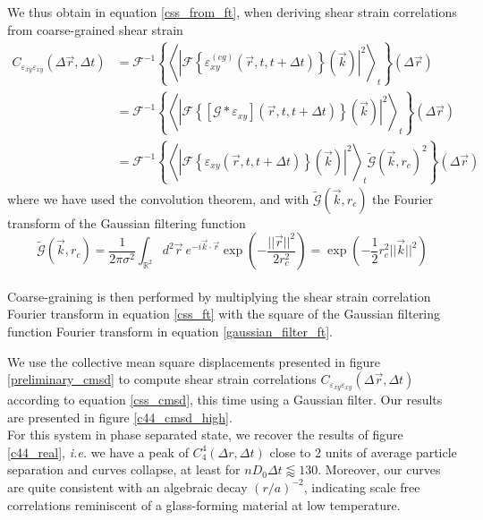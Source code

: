 \documentclass[class=report, float=false, crop=false]{standalone}
\begin{document}
We thus obtain in equation \ref{css_from_ft}, when deriving shear strain correlations from coarse-grained shear strain
\begin{equation}
\begin{aligned}
C_{\varepsilon_{xy}\varepsilon_{xy}}(\Delta \vec{r}, \Delta t) &= \mathcal{F}^{-1}\left\{\left<|\mathcal{F}\left\{\varepsilon_{xy}^{(cg)}(\vec{r}, t, t + \Delta t)\right\}(\vec{k})|^2\right>_t\right\}(\Delta \vec{r})\\
&= \mathcal{F}^{-1}\left\{\left<|\mathcal{F}\left\{\left[\mathcal{G}\ast\varepsilon_{xy}\right](\vec{r}, t, t + \Delta t)\right\}(\vec{k})|^2\right>_t\right\}(\Delta \vec{r})\\
&= \mathcal{F}^{-1}\left\{\left<|\mathcal{F}\left\{\varepsilon_{xy}(\vec{r}, t, t + \Delta t)\right\}(\vec{k})|^2\right>_t\tilde{\mathcal{G}}(\vec{k}, r_c)^2\right\}(\Delta \vec{r})
\end{aligned}
\end{equation}
where we have used the convolution theorem, and with $\tilde{\mathcal{G}}(\vec{k}, r_c)$ the Fourier transform of the Gaussian filtering function
\begin{equation}
\tilde{\mathcal{G}}(\vec{k}, r_c) =  \frac{1}{2\pi\sigma^2} \int_{\mathbb{R}^2} d^2\vec{r}~ e^{-i\vec{k}\cdot\vec{r}}\exp\left(-\frac{||\vec{r}||^2}{2r_c^2}\right) = \exp\left(-\frac{1}{2}r_c^2||\vec{k}||^2\right)
\label{gaussian_filter_ft}
\end{equation}
\mbox{}\\

Coarse-graining is then performed by multiplying the shear strain correlation Fourier transform in equation \ref{css_ft} with the square of the Gaussian filtering function Fourier transform in equation \ref{gaussian_filter_ft}.


We use the collective mean square displacements presented in figure \ref{preliminary_cmsd} to compute shear strain correlations $C_{\varepsilon_{xy}\varepsilon_{xy}}(\Delta \vec{r}, \Delta t)$ according to equation \ref{css_cmsd}, this time using a Gaussian filter. Our results are presented in figure \ref{c44_cmsd_high}.\\

For this system in phase separated state, we recover the results of figure \ref{c44_real}, \textit{i.e.} we have a peak of $C_4^4(\Delta r, \Delta t)$ close to 2 units of average particle separation and curves collapse, at least for $nD_0\Delta t \lessapprox 130$. Moreover, our curves are quite consistent with an algebraic decay $(r/a)^{-2}$, indicating scale free correlations reminiscent of a glass-forming material at low temperature.
\end{document}
